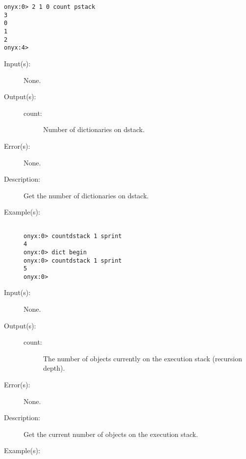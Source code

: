 \begin{description}
\begin{description}
\begin{verbatim}
onyx:0> 2 1 0 count pstack
3
0
1
2
onyx:4>
		\end{verbatim}
	\end{description}
\label{systemdict:countdstack}
\item[{\onyxop{--}{countdstack}{count}}: ]
	\begin{description}\item[]
	\item[Input(s): ] None.
	\item[Output(s): ]
		\begin{description}\item[]
		\item[count: ]
			Number of dictionaries on dstack.
		\end{description}
	\item[Error(s): ] None.
	\item[Description: ]
		Get the number of dictionaries on dstack.
	\item[Example(s): ]\begin{verbatim}

onyx:0> countdstack 1 sprint
4
onyx:0> dict begin
onyx:0> countdstack 1 sprint
5
onyx:0>
		\end{verbatim}
	\end{description}
\label{systemdict:countestack}
\item[{\onyxop{--}{countestack}{count}}: ]
	\begin{description}\item[]
	\item[Input(s): ] None.
	\item[Output(s): ]
		\begin{description}\item[]
		\item[count: ]
			The number of objects currently on the execution stack
			(recursion depth).
		\end{description}
	\item[Error(s): ] None.
	\item[Description: ]
		Get the current number of objects on the execution stack.
	\item[Example(s): ]\begin{verbatim}


\end{verbatim}
\end{description}
\end{description}
